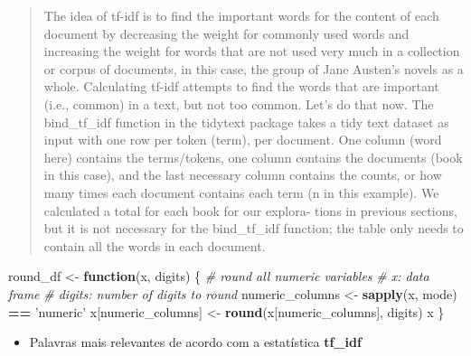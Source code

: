 \documentclass[]{article}
\newenvironment{Shaded}{\begin{snugshade}}{\end{snugshade}}
\newcommand{\KeywordTok}[1]{\textcolor[rgb]{0.13,0.29,0.53}{\textbf{#1}}}
\newcommand{\StringTok}[1]{\textcolor[rgb]{0.31,0.60,0.02}{#1}}
\newcommand{\CommentTok}[1]{\textcolor[rgb]{0.56,0.35,0.01}{\textit{#1}}}
\newcommand{\ControlFlowTok}[1]{\textcolor[rgb]{0.13,0.29,0.53}{\textbf{#1}}}
\newcommand{\OperatorTok}[1]{\textcolor[rgb]{0.81,0.36,0.00}{\textbf{#1}}}
\newcommand{\NormalTok}[1]{#1}
\providecommand{\tightlist}{%
  \setlength{\itemsep}{0pt}\setlength{\parskip}{0pt}}
\begin{document}
\begin{quote}
The idea of tf-idf is to find the important words for the content of
each document by decreasing the weight for commonly used words and
increasing the weight for words that are not used very much in a
collection or corpus of documents, in this case, the group of Jane
Austen's novels as a whole. Calculating tf-idf attempts to find the
words that are important (i.e., common) in a text, but not too common.
Let's do that now. The bind\_tf\_idf function in the tidytext package
takes a tidy text dataset as input with one row per token (term), per
document. One column (word here) contains the terms/tokens, one column
contains the documents (book in this case), and the last necessary
column contains the counts, or how many times each document contains
each term (n in this example). We calculated a total for each book for
our explora‐ tions in previous sections, but it is not necessary for the
bind\_tf\_idf function; the table only needs to contain all the words in
each document.
\end{quote}

\begin{Shaded}
\begin{Highlighting}[]
\NormalTok{round_df <-}\StringTok{ }\ControlFlowTok{function}\NormalTok{(x, digits) \{}
    \CommentTok{# round all numeric variables}
    \CommentTok{# x: data frame }
    \CommentTok{# digits: number of digits to round}
\NormalTok{    numeric_columns <-}\StringTok{ }\KeywordTok{sapply}\NormalTok{(x, mode) }\OperatorTok{==}\StringTok{ 'numeric'}
\NormalTok{    x[numeric_columns] <-}\StringTok{  }\KeywordTok{round}\NormalTok{(x[numeric_columns], digits)}
\NormalTok{    x}
\NormalTok{\}}
\end{Highlighting}
\end{Shaded}

\begin{itemize}
\tightlist
\item
  Palavras mais relevantes de acordo com a estatística \textbf{tf\_idf}
\end{itemize}
\end{document}
